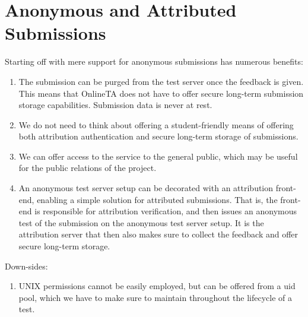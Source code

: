 \section{Anonymous and Attributed Submissions}

Starting off with mere support for anonymous submissions has numerous benefits:

\begin{enumerate}

\item The submission can be purged from the test server once the feedback is
given. This means that OnlineTA does not have to offer secure long-term
submission storage capabilities. Submission data is never at rest.

\item We do not need to think about offering a student-friendly means of
offering both attribution authentication and secure long-term storage of
submissions.

\item We can offer access to the service to the general public, which may be
useful for the public relations of the project.

\item An anonymous test server setup can be decorated with an attribution
front-end, enabling a simple solution for attributed submissions. That is, the
front-end is responsible for attribution verification, and then issues an
anonymous test of the submission on the anonymous test server setup. It is the
attribution server that then also makes sure to collect the feedback and offer
secure long-term storage.

\end{enumerate}

Down-sides:

\begin{enumerate}

\item UNIX permissions cannot be easily employed, but can be offered from a uid
pool, which we have to make sure to maintain throughout the lifecycle of a
test.

\end{enumerate}
